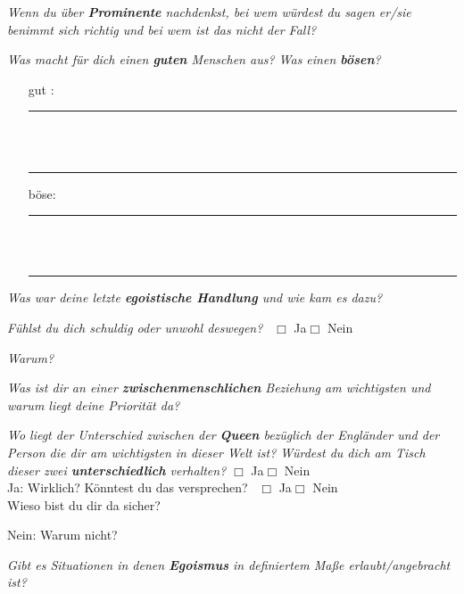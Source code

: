 \documentclass[a4paper,12pt]{scrartcl}
\newcommand{\checkbox}{\(\Box\)}
\newcommand{\hfilloutline}[1]{\rule{#1}{0.5pt}}
\newcommand{\frage}[1]{\textit{#1}}
\renewcommand{\emph}[1]{\textbf{#1}}
\begin{document}
\frage{Wenn du über \emph{Prominente} nachdenkst, bei wem würdest du sagen er/sie benimmt sich richtig und bei wem ist das nicht der Fall?}
\vspace{3cm}

\frage{Was macht für dich einen \emph{guten} Menschen aus? Was einen \emph{bösen}?}
\begin{enumerate}
    \item [gut :]\hfill\hfilloutline{15cm}\\ \\ \hfill\hfilloutline{15cm}
    \item [böse:]\hfill\hfilloutline{15cm}\\ \\ \hfill\hfilloutline{15cm}
\end{enumerate}
\vspace{1cm}

\frage{Was war deine letzte \emph{egoistische Handlung} und wie kam es dazu?}
\vspace{4cm}

\frage{Fühlst du dich schuldig oder unwohl deswegen?} \ \checkbox{} Ja\hspace{0.8cm}\checkbox{} Nein
\newpage

\frage{Warum?}
\vspace{3cm}

\frage{Was ist dir an einer \emph{zwischenmenschlichen} Beziehung am wichtigsten und warum liegt deine Priorität da?}
\vspace{4cm}

\frage{Wo liegt der Unterschied zwischen der \emph{Queen} bezüglich der Engländer und der Person die dir am wichtigsten in dieser Welt ist?
Würdest du dich am Tisch dieser zwei \emph{unterschiedlich} verhalten?}
\checkbox{} Ja\hspace{0.8cm}\checkbox{} Nein \\

Ja: Wirklich? Könntest du das versprechen? \ \checkbox{} Ja\hspace{0.8cm}\checkbox{} Nein \\
Wieso bist du dir da sicher?
\vspace{2cm}

Nein: Warum nicht? 
\vspace{3cm}

\frage{Gibt es Situationen in denen \emph{Egoismus} in definiertem Maße erlaubt/angebracht ist?}
\vspace{3cm}
\end{document}
